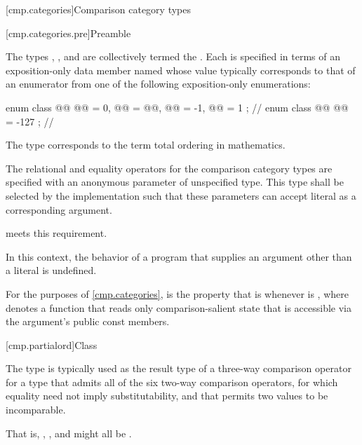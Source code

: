 [cmp.categories]{Comparison category types}

[cmp.categories.pre]{Preamble}

\pnum
The types
,
, and
are collectively termed the .
Each is specified in terms of an exposition-only data member named 
whose value typically corresponds to that of an enumerator
from one of the following exposition-only enumerations:

\begin{codeblock}
enum class @@ { @@ = 0, @@ = @@, @@ = -1, @@ = 1 }; // \expos
enum class @@ { @@ = -127 };                                     // \expos
\end{codeblock}

\pnum
\begin{note}
The type 
corresponds to the term
total ordering in mathematics.
\end{note}

\pnum
The relational and equality operators for the comparison category types
are specified with an anonymous parameter of unspecified type.
This type shall be selected by the implementation such that
these parameters can accept literal  as a corresponding argument.
\begin{example}
meets this requirement.
\end{example}
In this context, the behavior of a program that supplies
an argument other than a literal  is undefined.

\pnum
For the purposes of \ref{cmp.categories},
 is the property that  is 
whenever  is ,
where  denotes a function that reads only comparison-salient state
that is accessible via the argument's public const members.

[cmp.partialord]{Class }

\pnum
The  type is typically used
as the result type of a three-way comparison operator
for a type that admits
all of the six two-way comparison operators,
for which equality need not imply substitutability,
and that permits two values to be incomparable.%
\begin{footnote}
That is, , , and  might all be .
\end{footnote}

